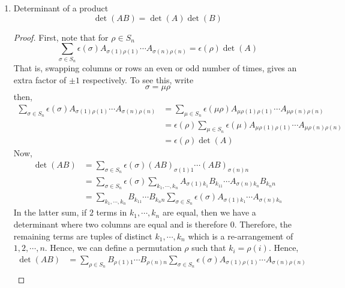 \documentclass{article}
\numberwithin{equation}{section}
\begin{document}
\begin{enumerate}
        \item Determinant of a product
        \begin{equation}\label{eq:3-31}
            \det(AB) = \det(A) \det(B)
        \end{equation}
        \begin{proof}
            First, note that for $\rho \in S_n$
            \begin{equation}\label{eq:3-32}
                \sum_{\sigma \in S_n} \epsilon(\sigma) A_{\sigma(1)\rho(1)} \cdots A_{\sigma(n)\rho(n)} = \epsilon(\rho) \det(A) 
            \end{equation}
            That is, swapping columns or rows an even or odd number of times, gives an extra factor of $\pm 1$ respectively. To see this, write
            \[
                \sigma = \mu \rho  
            \]
            then,
            \begin{align*}
                \sum_{\sigma \in S_n} \epsilon(\sigma) A_{\sigma(1)\rho(1)} \cdots A_{\sigma(n)\rho(n)} &= \sum_{\mu \in S_n} \epsilon(\mu \rho) A_{\mu \rho(1)\rho(1)} \cdots A_{\mu \rho(n)\rho(n)} \\
                &= \epsilon(\rho) \sum_{\mu \in S_n} \epsilon(\mu) A_{\mu \rho(1)\rho(1)} \cdots A_{\mu \rho(n)\rho(n)} \\
                &= \epsilon(\rho) \det(A)
            \end{align*}
            Now, 
            \begin{align*}
                \det(AB) &= \sum_{\sigma \in S_n} \epsilon(\sigma) (AB)_{\sigma(1)1} \cdots (AB)_{\sigma(n)n} \\
                &= \sum_{\sigma \in S_n} \epsilon(\sigma) \sum_{k_1, \cdots, k_n} A_{\sigma(1)k_1}B_{k_11} \cdots A_{\sigma(n)k_n}B_{k_nn} \\
                &= \sum_{k_1, \cdots, k_n} B_{k_11} \cdots B_{k_nn} \sum_{\sigma \in S_n} \epsilon(\sigma) A_{\sigma(1)k_1} \cdots A_{\sigma(n)k_n}
            \end{align*}
            In the latter sum, if $2$ terms in $k_1, \cdots, k_n$ are equal, then we have a determinant where two columns are equal and is therefore $0$.
            Therefore, the remaining terms are tuples of distinct $k_1, \cdots, k_n$ which is a re-arrangement of $1, 2, \cdots, n$.
            Hence, we can define a permutation $\rho$ such that $k_i = \rho(i)$. Hence, 
            \begin{align*}
                \det(AB) &= \sum_{\rho \in S_n} B_{\rho(1)1} \cdots B_{\rho(n)n} \sum_{\sigma \in S_n} \epsilon(\sigma) A_{\sigma(1)\rho(1)} \cdots A_{\sigma(n)\rho(n)} \\

\end{align*}
\end{proof}
\end{enumerate}
\end{document}
